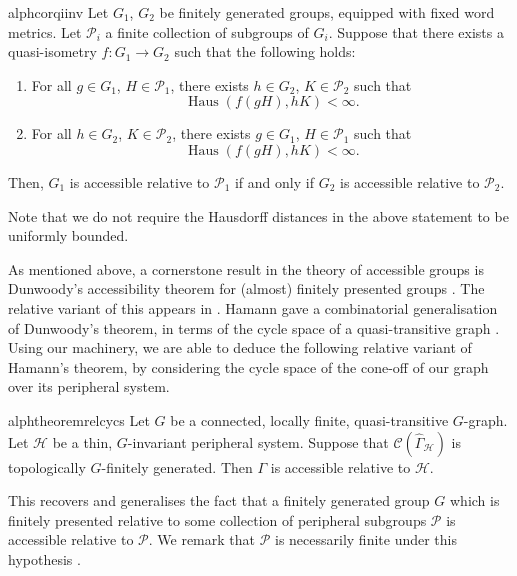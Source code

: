 \documentclass[11pt,a4paper]{amsart}
\DeclareMathOperator{\dHaus}{Haus}
\theoremstyle{definition}
\newcommand{\per}{\mathcal{H}}
\newcommand{\cyc}{\mathscr{C}}
\begin{document}
\begin{restatable}{alphcor}{qiinv}\label{cor:qi-invariance}
    Let $G_1$, $G_2$ be finitely generated groups, equipped with fixed word metrics. Let $\mathcal P_i$ a finite collection of subgroups of $G_i$. Suppose that there exists a quasi-isometry $f : G_1 \to G_2$ 
    such that the following holds:
    \begin{enumerate}
        \item\label{itm:qi-1} For all $g \in G_1$, $H \in \mathcal P_1$, there exists $h \in G_{2}$, $K \in \mathcal P_{2}$ such that
    $$
    \dHaus(f(gH), hK)<\infty.
    $$ 

        \item\label{itm:qi-2} For all $h \in G_2$, $K \in \mathcal P_2$, there exists  $g \in G_1$, $H \in \mathcal P_1$ such that
    $$
    \dHaus(f(gH), hK)<\infty.
    $$ 
    \end{enumerate}
    Then, $G_1$ is accessible relative to $\mathcal P_1$ if and only if $G_2$ is accessible relative to $\mathcal P_2$. 
\end{restatable}

Note that we do not require the Hausdorff distances in the above statement to be uniformly bounded. 

As mentioned above, a cornerstone result in the theory of accessible groups is Dunwoody's accessibility theorem for (almost) finitely presented groups \cite{dunwoody1985accessibility}. The relative variant of this appears in \cite[Prop.~2.24]{jsj}. Hamann gave a combinatorial generalisation of Dunwoody's theorem, in terms of the cycle space of a quasi-transitive graph \cite{hamann2018accessibility}. Using our machinery, we are able to deduce the following relative variant of Hamann's theorem, by considering  the cycle space of the cone-off of our graph over its peripheral system.


\begin{restatable}{alphtheorem}{relcycs}\label{thm:rel-cyc-accessibility}
    Let $G$ be a connected, locally finite, quasi-transitive $G$-graph. Let $\per$ be a thin, $G$-invariant peripheral system. Suppose that ${\cyc(\widehat \Gamma_\per)}$ is topologically $G$-finitely generated. Then $\Gamma$ is accessible relative to $\per$. 
\end{restatable}

This recovers and generalises the fact that a finitely generated group $G$ which is finitely presented relative to some collection of peripheral subgroups $\mathcal P$ is accessible relative to $\mathcal P$. We remark that $\mathcal P$ is necessarily finite under this hypothesis \cite[Thm.~1.1]{osin2004relhyp}.
\end{document}
